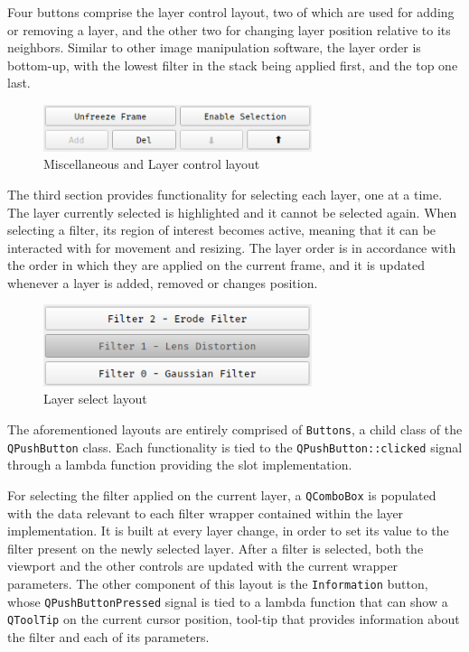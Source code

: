 Four buttons comprise the layer control layout, two of which are used for adding or removing a layer, and  the
other two for changing layer position relative to its neighbors. Similar to other image manipulation software,
the layer order is bottom-up, with the lowest filter in the stack being applied first, and the top one last.

\begin{figure}[H]
	\includegraphics[width=0.7\textwidth, height=0.2\textwidth]{resources/Buttons_Misc.png}
	\caption{Miscellaneous and Layer control layout}
\end{figure}

The third section provides functionality for selecting each layer, one at a time. The layer currently selected
is highlighted and it cannot be selected again. When selecting a filter, its region of interest becomes active,
meaning that it can be interacted with for movement and resizing. The layer order is in accordance with the
order in which they are applied on the current frame, and it is updated whenever a layer is added, removed
or changes position.

\begin{figure}[H]
	\includegraphics[width=0.7\textwidth, height=0.3\textwidth]{resources/Buttons_Layers.png}
	\caption{Layer select layout}
\end{figure}

The aforementioned layouts are entirely comprised of \verb|Buttons|, a child class of the \verb|QPushButton|
class. Each functionality is tied to the \verb|QPushButton::clicked| signal through a lambda function providing
the slot implementation. \cite{qtDoc}

For selecting the filter applied on the current layer, a \verb|QComboBox| is populated with the data relevant
to each filter wrapper contained within the layer implementation. It is built at every layer change, in order
to set its value to the filter present on the newly selected layer. After a filter is selected, both the
viewport and the other controls are updated with the current wrapper parameters. The other component of this
layout is the \verb|Information| button, whose \verb|QPushButtonPressed| signal is tied to a lambda function
that can show a \verb|QToolTip| on the current cursor position, tool-tip that provides information about the
filter and each of its parameters. \cite{qtDoc}

